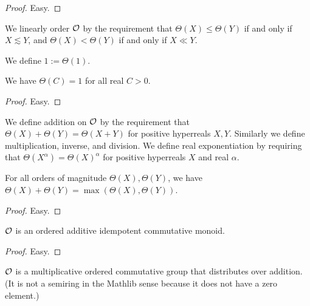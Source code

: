 \begin{proof} Easy.
\end{proof}

\begin{definition}\label{ord-mag-def}  We linearly order ${\mathcal O}$ by the requirement that $\Theta(X) \leq \Theta(Y)$ if and only if $X \lesssim Y$, and  $\Theta(X) < \Theta(Y)$ if and only if $X \ll Y$.
\end{definition}

\begin{definition}[One]\label{one-def} We define $1 := \Theta(1)$.
\end{definition}

\begin{lemma}\label{const-triv} We have $\Theta(C) = 1$ for all real $C>0$.
\end{lemma}

\begin{proof} Easy.
\end{proof}

\begin{definition}\label{mag-arith}  We define addition on ${\mathcal O}$ by the requirement that $\Theta(X) + \Theta(Y) = \Theta(X+Y)$ for positive hyperreals $X,Y$.  Similarly we define multiplication, inverse, and division.  We define real exponentiation by requiring that $\Theta(X^\alpha) = \Theta(X)^\alpha$ for positive hyperreals $X$ and real $\alpha$.
\end{definition}

\begin{lemma}\label{tropical-add} For all orders of magnitude $\Theta(X), \Theta(Y)$, we have $\Theta(X) + \Theta(Y) = \max(\Theta(X), \Theta(Y))$.
\end{lemma}

\begin{proof} Easy.
\end{proof}

\begin{corollary}\label{add-comm-mon} ${\mathcal O}$ is an ordered additive idempotent commutative monoid.
\end{corollary}

\begin{proof} Easy.
\end{proof}

\begin{lemma}\label{comm-semiring} ${\mathcal O}$ is a multiplicative ordered commutative group that distributes over addition.  (It is not a semiring in the Mathlib sense because it does not have a zero element.)
\end{lemma}

